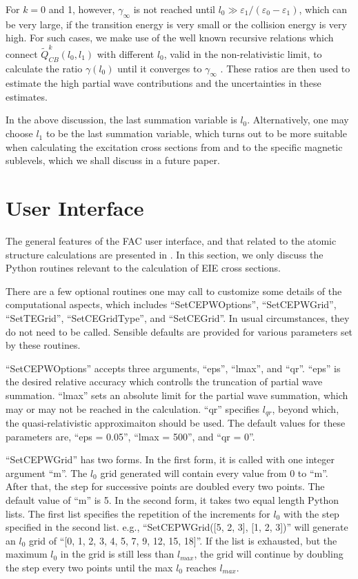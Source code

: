 \documentclass{elsart}
\begin{document}
For $k = 0$ and 1, however, $\gamma_\infty$ is not reached until $l_0 \gg
\varepsilon_1/(\varepsilon_0-\varepsilon_1)$, which can be very large, if the
transition energy is very small or the collision
energy is very high. For such cases, we make use of the well known recursive
relations which connect
$\tilde{Q}^k_{CB}(l_0,l_1)$ with different $l_0$, valid in the non-relativistic
limit, to calculate the ratio $\gamma(l_0)$ until it converges to
$\gamma_{\infty}$ \citep{burgess74}. These ratios are then used to estimate
the high partial wave contributions and the uncertainties in these estimates.

In the above discussion, the last summation variable is $l_0$. Alternatively,
one may choose $l_1$ to be the last summation variable, which turns out to be
more suitable when calculating the excitation cross sections from and to the
specific magnetic sublevels, which we shall discuss in a future paper. 

\section{User Interface}
\label{sec_program}
The general features of the FAC user interface, and that related to the atomic
structure calculations are presented in . In this section, we
only discuss the Python routines relevant to the calculation of EIE cross
sections. 

There are a few optional routines one may call to customize some details of
the computational aspects, which includes ``SetCEPWOptions'', ``SetCEPWGrid'',
``SetTEGrid'', ``SetCEGridType'', and ``SetCEGrid''. In usual circumstances,
they do not need to be called. Sensible defaults are provided for various
parameters set by these routines. 

``SetCEPWOptions''  accepts three arguments, ``eps'', ``lmax'', and
``qr''. ``eps'' is the desired relative accuracy which controlls the
truncation of partial wave summation. ``lmax'' sets an absolute limit for the
partial wave summation, which may or may not be reached in the calculation.
``qr'' specifies $l_{qr}$, beyond which, the quasi-relativistic approximaiton
should be used. The default values for these parameters are, ``eps = 0.05'',
``lmax = 500'', and ``qr = 0''.

``SetCEPWGrid'' has two forms. In the first form, it is called with one integer
argument ``m''. The $l_0$ grid generated will contain every value from 0 to
``m''. After that, the step for successive points are doubled every two
points. The default value of ``m'' is 5. In the second form, it takes two equal
length Python lists. The first list specifies the repetition of the increments
for $l_0$ with the step specified in the second list. e.g., 
``SetCEPWGrid([5, 2, 3], [1, 2, 3])'' will generate an $l_0$ grid of ``[0, 1,
2, 3, 4, 5, 7, 9, 12, 15, 18]''. If the list is exhausted, but the maximum
$l_0$ in the grid is still less than $l_{max}$, the grid will continue by
doubling the step every two points until the max $l_0$ reaches $l_{max}$.
\end{document}
